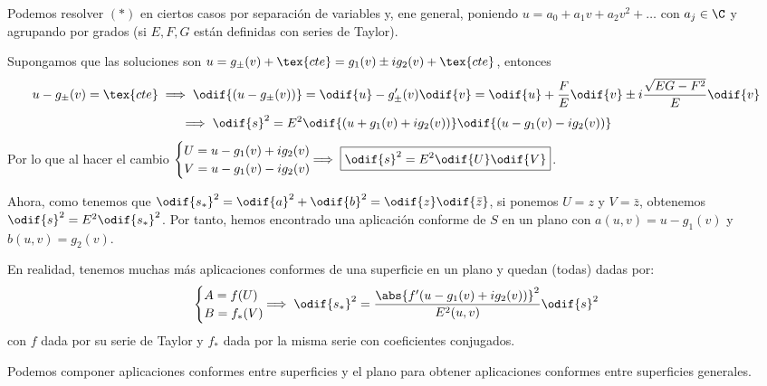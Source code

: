 Podemos resolver $(*)$ en ciertos casos por separación de variables y, ene general, poniendo $u = a_0 + a_1 v + a_2 v^2 + \dots$ con $a_j \in \C$ y agrupando por grados (si $E, F, G$ están definidas con series de Taylor).

Supongamos que las soluciones son $u = g_\pm(v) + \tex{cte} = g_1(v)\pm ig_2(v) + \tex{cte}$, entonces
\[u-g_\pm(v) = \tex{cte} \implies \odif{(u-g_\pm(v))} = \odif{u} - g'_\pm (v)\odif{v} = \odif{u} + \frac{F}{E}\odif{v} \pm i \frac{\sqrt{EG-F^2}}{E}\odif{v}\]
\[\implies \odif{s}^2 = E^2 \odif{\left(u + g_1(v) + i g_2(v)\right)}\odif{\left(u - g_1(v) - ig_2(v)\right)}\]
Por lo que al hacer el cambio $\begin{cases}
		U = u -g_1(v) + ig_2(v) \\
		V = u - g_1(v) - ig_2(v)
	\end{cases} \hspace{-0.5cm} \implies \boxed{\odif{s}^2 = E^2 \odif{U}\odif{V}}$.

Ahora, como tenemos que $\odif{s_*}^2 = \odif{a}^2 + \odif{b}^2 = \odif{z}\odif{\bar{z}}$, si ponemos $U = z$ y $V = \bar{z}$, obtenemos $\odif{s}^2 = E^2 \odif{s_*}^2$. Por tanto, hemos encontrado una aplicación conforme de $S$ en un plano con $a(u, v) = u - g_1(v)$ y $b(u, v) = g_2(v)$.

En realidad, tenemos muchas más aplicaciones conformes de una superficie en un plano y quedan (todas) dadas por:
\[\begin{cases}
		A = f(U) \\
		B = f_*(V)
	\end{cases} \hspace{-0.5cm} \implies \odif{s_*}^2 = \frac{\abs{f'(u-g_1(v) + ig_2(v))}^2}{E^2(u, v)}\odif{s}^2\]
con $f$ dada por su serie de Taylor y $f_*$ dada por la misma serie con coeficientes conjugados.

\begin{obs}
	Podemos componer aplicaciones conformes entre superficies y el plano para obtener aplicaciones conformes entre superficies generales.
\end{obs}

